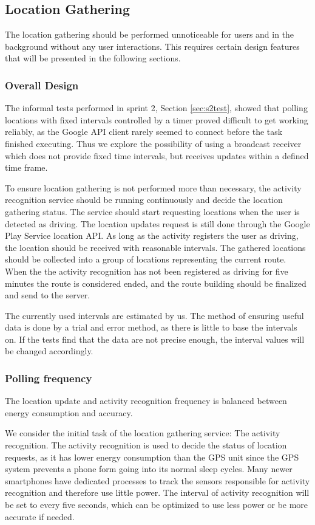\subsection{Location Gathering}\label{section:s3locgath}
The location gathering should be performed unnoticeable for users and in the background without any user interactions. 
This requires certain design features that will be presented in the following sections. 


\subsubsection{Overall Design}
The informal tests performed in sprint 2, Section \ref{sec:s2test}, showed that polling locations with fixed intervals controlled by a timer proved difficult to get working reliably, as the Google API client rarely seemed to connect before the task finished executing. 
Thus we explore the possibility of using a broadcast receiver which does not provide fixed time intervals, but receives updates within a defined time frame.

To ensure location gathering is not performed more than necessary, the activity recognition service should be running continuously and decide the location gathering status.
The service should start requesting locations when the user is detected as driving. 
The location updates request is still done through the Google Play Service location API.
As long as the activity registers the user as driving, the location should be received with reasonable intervals.
The gathered locations should be collected into a group of locations representing the current route.
When the the activity recognition has not been registered as driving for five minutes the route is considered ended, and the route building should be finalized and send to the server.


The currently used intervals are estimated by us.
The method of ensuring useful data is done by a trial and error method, as there is little to base the intervals on.
If the tests find that the data are not precise enough, the interval values will be changed accordingly.

\subsubsection{Polling frequency}
The location update and activity recognition frequency is balanced between energy consumption and accuracy.

We consider the initial task of the location gathering service: The activity recognition.
The activity recognition is used to decide the status of location requests, as it has lower energy consumption than the GPS unit \cite{fuckGPS} since the GPS system prevents a phone form going into its normal sleep cycles.
Many newer smartphones \cite{coCPU} have dedicated processes to track the sensors responsible for activity recognition and therefore use little power.
The interval of activity recognition will be set to every five seconds, which can be optimized to use less power or be more accurate if needed.

